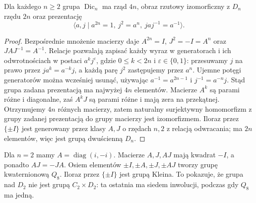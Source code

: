 \begin{twierdzenie}
\label{aa:tw:binary-dicyclic}
Dla każdego $n\ge2$ grupa $\operatorname{Dic}_n$
ma rząd $4n$, obraz rzutowy izomorficzny z $D_n$
rzędu $2n$ oraz prezentację
\[
 \langle a,j\mid
 a^{2n}=1,\ j^2=a^n,\ jaj^{-1}=a^{-1}\rangle.
\]
\end{twierdzenie}
\begin{proof}
Bezpośrednie mnożenie macierzy daje
$A^{2n}=I$, $J^2=-I=A^n$ oraz $JAJ^{-1}=A^{-1}$.
Relacje pozwalają zapisać każdy wyraz w generatorach
i ich odwrotnościach w postaci $a^k j^\varepsilon$,
gdzie $0\le k<2n$ i $\varepsilon\in\{0,1\}$:
przesuwamy $j$ na prawo przez $ja^k=a^{-k}j$,
a każdą parę $j^2$ zastępujemy przez $a^n$.
Ujemne potęgi generatorów można wcześniej usunąć,
używając $a^{-1}=a^{2n-1}$ i $j^{-1}=a^{-n}j$.
Stąd grupa zadana prezentacją ma najwyżej $4n$ elementów.
Macierze $A^k$ są parami różne i diagonalne,
zaś $A^kJ$ są parami różne i mają zera na przekątnej.
Otrzymujemy $4n$ różnych macierzy, zatem naturalny
surjektywny homomorfizm z grupy zadanej prezentacją
do grupy macierzy jest izomorfizmem.
Iloraz przez $\{\pm I\}$ jest generowany przez klasy
$A,J$ o rzędach $n,2$ z relacją odwracania; ma $2n$
elementów, więc jest grupą dwuścienną $D_n$.
\end{proof}

\begin{przyklad}
\label{aa:prz:binary-q8}
Dla $n=2$ mamy $A=\operatorname{diag}(i,-i)$.
Macierze $A,J,AJ$ mają kwadrat $-I$, a ponadto
$AJ=-JA$. Osiem elementów $\pm I,\pm A,\pm J,\pm AJ$
tworzy grupę kwaternionową $Q_8$.
Iloraz przez $\{\pm I\}$ jest grupą Kleina.
To pokazuje, że grupa nad $D_2$ nie jest grupą
$C_2\times D_2$: ta ostatnia ma siedem inwolucji,
podczas gdy $Q_8$ ma jedną.
\end{przyklad}


